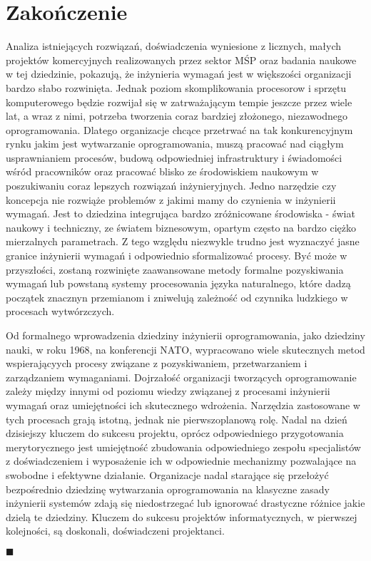     
  \section{Zakończenie}

    Analiza istniejących rozwiązań, doświadczenia wyniesione z licznych, małych projektów komercyjnych realizowanych przez sektor MŚP oraz badania naukowe w tej dziedzinie, pokazują, że inżynieria wymagań jest w większości organizacji bardzo słabo rozwinięta. Jednak poziom skomplikowania procesorow i sprzętu komputerowego będzie rozwijał się w zatrważającym tempie jeszcze przez wiele lat, a wraz z nimi, potrzeba tworzenia coraz bardziej złożonego, niezawodnego oprogramowania. Dlatego organizacje chcące przetrwać na tak konkurencyjnym rynku jakim jest wytwarzanie oprogramowania, muszą pracować nad ciągłym usprawnianiem procesów, budową odpowiedniej infrastruktury i świadomości wśród pracowników oraz pracować blisko ze środowiskiem naukowym w poszukiwaniu coraz lepszych rozwiązań inżynieryjnych. Jedno narzędzie czy koncepcja nie rozwiąże problemów z jakimi mamy do czynienia w inżynierii wymagań. Jest to dziedzina integrująca bardzo zróżnicowane środowiska - świat naukowy i techniczny, ze światem biznesowym, opartym często na bardzo ciężko mierzalnych parametrach. Z tego względu niezwykle trudno jest wyznaczyć jasne granice inżynierii wymagań i odpowiednio sformalizować procesy. Być może w przyszłości, zostaną rozwinięte zaawansowane metody formalne pozyskiwania wymagań lub powstaną systemy procesowania języka naturalnego, które dadzą początek znacznyn przemianom i zniwelują zależność od czynnika ludzkiego w procesach wytwórzczych. 

    Od formalnego wprowadzenia dziedziny inżynierii oprogramowania, jako dziedziny nauki, w roku 1968, na konferencji NATO, wypracowano wiele skutecznych metod wspierającyych procesy związane z pozyskiwaniem, przetwarzaniem i zarządzaniem wymaganiami. Dojrzałość organizacji tworzących oprogramowanie zależy między innymi od poziomu wiedzy związanej z procesami inżynierii wymagań oraz umiejętności ich skutecznego wdrożenia. Narzędzia zastosowane w tych procesach grają istotną, jednak nie pierwszoplanową rolę. Nadal na dzień dzisiejszy kluczem do sukcesu projektu, oprócz odpowiedniego przygotowania merytorycznego jest umiejętność zbudowania odpowiedniego zespołu specjalistów z doświadczeniem i wyposażenie ich w odpowiednie mechanizmy pozwalające na swobodne i efektywne działanie. Organizacje nadal starające się przełożyć bezpośrednio dziedzinę wytwarzania oprogramowania na klasyczne zasady inżynierii systemów zdają się niedostrzegać lub ignorować drastyczne różnice jakie dzielą te dziedziny. Kluczem do sukcesu projektów informatycznych, w pierwszej kolejności, są doskonali, doświadczeni projektanci.

$ \blacksquare $
